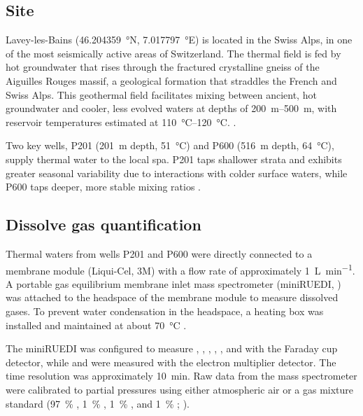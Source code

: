 \subsection{Site}
Lavey-les-Bains (\SI{46.204359}{\degree}N, \SI{7.017797}{\degree}E) is located in the Swiss Alps, in one of the most seismically active areas of Switzerland.
The thermal field is fed by hot groundwater that rises through the fractured crystalline gneiss of the Aiguilles Rouges massif, a geological formation that straddles the French and Swiss Alps.
This geothermal field facilitates mixing between ancient, hot groundwater and cooler, less evolved waters at depths of \SIrange{200}{500}{\meter}, with reservoir temperatures estimated at \SIrange{110}{120}{\celsius}. \citep{sonney2009numerical, wanner2019quantification, giroud2025microbio}.

Two key wells, P201 (\SI{201}{\meter} depth, \SI{51}{\celsius}) and P600 (\SI{516}{\meter} depth, \SI{64}{\celsius}), supply thermal water to the local spa.
P201 taps shallower strata and exhibits greater seasonal variability due to interactions with colder surface waters, while P600 taps deeper, more stable mixing ratios \citep{sonney2009numerical, giroud2025microbio}.

\subsection{Dissolve gas quantification}
Thermal waters from wells P201 and P600 were directly connected to a membrane module (Liqui-Cel\textsuperscript{\texttrademark}, 3M\textsuperscript{\texttrademark}) with a flow rate of approximately \SI{1}{\liter\per\minute}.
A portable gas equilibrium membrane inlet mass spectrometer (miniRUEDI, \cite{brennwald2016portable}) was attached to the headspace of the membrane module to measure dissolved gases.
To prevent water condensation in the headspace, a heating box was installed and maintained at about \SI{70}{\celsius} \citep{giroud2023new}.

The miniRUEDI was configured to measure , , , , , and  with the Faraday cup detector, while  and  were measured with the electron multiplier detector.
The time resolution was approximately \SI{10}{\minute}.
Raw data from the mass spectrometer were calibrated to partial pressures using either atmospheric air \citep{porcelli2002overview} or a gas mixture standard (\SI{97}{\percent} , \SI{1}{\percent} , \SI{1}{\percent} , and \SI{1}{\percent} ; \cite{tomonaga2019montterri}).



